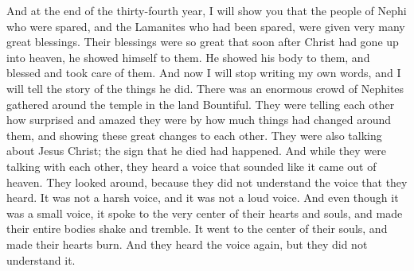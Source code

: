 And at the end of the thirty-fourth year, I will show you that the people of Nephi who were spared, and the Lamanites who had been spared, were given very many great blessings. Their blessings were so great that soon after Christ had gone up into heaven, he showed himself to them.
\bverse \iffalse Showing his body unto them, and ministering unto them; and an account of his ministry shall be given hereafter. Therefore for this time I make an end of my sayings. \fi
He showed his body to them, and blessed and took care of them. And now I will stop writing my own words, and I will tell the story of the things he did.
\bchapter
\bverse \iffalse And now it came to pass that there were a great multitude gathered together, of the people of Nephi, round about the temple which was in the land Bountiful; and they were marveling and wondering one with another, and were showing one to another the great and marvelous change which had taken place. \fi
There was an enormous crowd of Nephites gathered around the temple in the land Bountiful. They were telling each other how surprised and amazed they were by how much things had changed around them, and showing these great changes to each other.
\bverse \iffalse And they were also conversing about this Jesus Christ, of whom the sign had been given concerning his death. \fi
They were also talking about Jesus Christ; the sign that he died had happened.
\bverse \iffalse And it came to pass that while they were thus conversing one with another, they heard a voice as if it came out of heaven; and they cast their eyes round about, for they understood not the voice which they heard; and it was not a harsh voice, neither was it a loud voice; nevertheless, and notwithstanding it being a small voice it did pierce them that did hear to the center, insomuch that there was no part of their frame that it did not cause to quake; yea, it did pierce them to the very soul, and did cause their hearts to burn. \fi
And while they were talking with each other, they heard a voice that sounded like it came out of heaven. They looked around, because they did not understand the voice that they heard. It was not a harsh voice, and it was not a loud voice. And even though it was a small voice, it spoke to the very center of their hearts and souls, and made their entire bodies shake and tremble. It went to the center of their souls, and made their hearts burn.
\bverse \iffalse And it came to pass that again they heard the voice, and they understood it not. \fi
And they heard the voice again, but they did not understand it.
